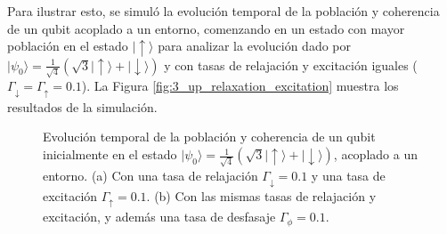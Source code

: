 Para ilustrar esto, se simuló la evolución temporal de la población y coherencia de un qubit acoplado a un entorno, comenzando en un estado con mayor población en el estado \(|\uparrow\rangle\) para analizar la evolución dado por \(|\psi_0\rangle = \frac{1}{\sqrt{4}} (\sqrt{3}|\uparrow\rangle + |\downarrow\rangle)\)  y con tasas de relajación y excitación iguales (\(\Gamma_\downarrow = \Gamma_\uparrow = 0.1\)). La Figura \ref{fig:3_up_relaxation_excitation} muestra los resultados de la simulación.

\begin{figure}[htbp]
    \centering
    \hfill
    \caption{Evolución temporal de la población y coherencia de un qubit inicialmente en el estado \(|\psi_0\rangle = \frac{1}{\sqrt{4}} (\sqrt{3}|\uparrow\rangle + |\downarrow\rangle)\), acoplado a un entorno.  
    (a) Con una tasa de relajación \(\Gamma_\downarrow = 0.1\) y una tasa de excitación \(\Gamma_\uparrow = 0.1\).  
    (b) Con las mismas tasas de relajación y excitación, y además una tasa de desfasaje \(\Gamma_\phi = 0.1\).}
    \label{fig:qubit_evolution}
\end{figure}




